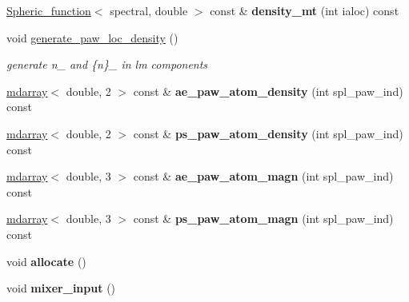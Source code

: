 \begin{DoxyCompactItemize}
\item 
\hypertarget{classsirius_1_1_density_aabf84b2f2f591ce324f4cdef860aff87}{}\hyperlink{classsirius_1_1_spheric__function}{Spheric\+\_\+function}$<$ spectral, double $>$ const \& {\bfseries density\+\_\+mt} (int ialoc) const \label{classsirius_1_1_density_aabf84b2f2f591ce324f4cdef860aff87}

\item 
void \hyperlink{classsirius_1_1_density_af7904609f7a2d6f197ad1cb8cdef119a}{generate\+\_\+paw\+\_\+loc\+\_\+density} ()
\begin{DoxyCompactList}\small\item\em generate n\+\_ and \{n\}\+\_ in lm components \end{DoxyCompactList}\item 
\hypertarget{classsirius_1_1_density_afbe5677ecf2c45f13e8541476acb7335}{}\hyperlink{classsddk_1_1mdarray}{mdarray}$<$ double, 2 $>$ const \& {\bfseries ae\+\_\+paw\+\_\+atom\+\_\+density} (int spl\+\_\+paw\+\_\+ind) const \label{classsirius_1_1_density_afbe5677ecf2c45f13e8541476acb7335}

\item 
\hypertarget{classsirius_1_1_density_a68ee66d5d605b0ee42a3127b6c2592fc}{}\hyperlink{classsddk_1_1mdarray}{mdarray}$<$ double, 2 $>$ const \& {\bfseries ps\+\_\+paw\+\_\+atom\+\_\+density} (int spl\+\_\+paw\+\_\+ind) const \label{classsirius_1_1_density_a68ee66d5d605b0ee42a3127b6c2592fc}

\item 
\hypertarget{classsirius_1_1_density_aa680b172d0b1fe1d5baa1b9c384641b2}{}\hyperlink{classsddk_1_1mdarray}{mdarray}$<$ double, 3 $>$ const \& {\bfseries ae\+\_\+paw\+\_\+atom\+\_\+magn} (int spl\+\_\+paw\+\_\+ind) const \label{classsirius_1_1_density_aa680b172d0b1fe1d5baa1b9c384641b2}

\item 
\hypertarget{classsirius_1_1_density_a8932888049ef7b42f101e021770f5aa4}{}\hyperlink{classsddk_1_1mdarray}{mdarray}$<$ double, 3 $>$ const \& {\bfseries ps\+\_\+paw\+\_\+atom\+\_\+magn} (int spl\+\_\+paw\+\_\+ind) const \label{classsirius_1_1_density_a8932888049ef7b42f101e021770f5aa4}

\item 
\hypertarget{classsirius_1_1_density_a35de82206d34dd89f4fde19cb9b114f4}{}void {\bfseries allocate} ()\label{classsirius_1_1_density_a35de82206d34dd89f4fde19cb9b114f4}

\item 
\hypertarget{classsirius_1_1_density_ac49bc0be91cfc0e1c6de821959ed2211}{}void {\bfseries mixer\+\_\+input} ()\label{classsirius_1_1_density_ac49bc0be91cfc0e1c6de821959ed2211}


\end{DoxyCompactItemize}
